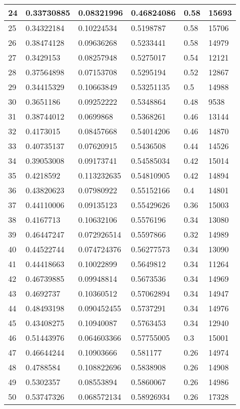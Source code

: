 \begin{longtable}{|l|l|l|l|l|l|}
24 & 0.33730885 & 0.08321996 & 0.46824086 & 0.58 & 15693 \\ \hline 
25 & 0.34322184 & 0.10224534 & 0.5198787 & 0.58 & 15706 \\ \hline 
26 & 0.38474128 & 0.09636268 & 0.5233441 & 0.58 & 14979 \\ \hline 
27 & 0.3429153 & 0.08257948 & 0.5275017 & 0.54 & 12121 \\ \hline 
28 & 0.37564898 & 0.07153708 & 0.5295194 & 0.52 & 12867 \\ \hline 
29 & 0.34415329 & 0.10663849 & 0.53251135 & 0.5 & 14988 \\ \hline 
30 & 0.3651186 & 0.09252222 & 0.5348864 & 0.48 & 9538 \\ \hline 
31 & 0.38744012 & 0.0699868 & 0.5368261 & 0.46 & 13144 \\ \hline 
32 & 0.4173015 & 0.08457668 & 0.54014206 & 0.46 & 14870 \\ \hline 
33 & 0.40735137 & 0.07620915 & 0.5436508 & 0.44 & 14526 \\ \hline 
34 & 0.39053008 & 0.09173741 & 0.54585034 & 0.42 & 15014 \\ \hline 
35 & 0.4218592 & 0.113232635 & 0.54810905 & 0.42 & 14894 \\ \hline 
36 & 0.43820623 & 0.07980922 & 0.55152166 & 0.4 & 14801 \\ \hline 
37 & 0.44110006 & 0.09135123 & 0.55429626 & 0.36 & 15003 \\ \hline 
38 & 0.4167713 & 0.10632106 & 0.5576196 & 0.34 & 13080 \\ \hline 
39 & 0.46447247 & 0.072926514 & 0.5597866 & 0.32 & 14989 \\ \hline 
40 & 0.44522744 & 0.074724376 & 0.56277573 & 0.34 & 13090 \\ \hline 
41 & 0.44418663 & 0.10022899 & 0.5649812 & 0.34 & 11264 \\ \hline 
42 & 0.46739885 & 0.09948814 & 0.5673536 & 0.34 & 14969 \\ \hline 
43 & 0.4692737 & 0.10360512 & 0.57062894 & 0.34 & 14947 \\ \hline 
44 & 0.48493198 & 0.090452455 & 0.5737291 & 0.34 & 14976 \\ \hline 
45 & 0.43408275 & 0.10940087 & 0.5763453 & 0.34 & 12940 \\ \hline 
46 & 0.51443976 & 0.064603366 & 0.57755005 & 0.3 & 15001 \\ \hline 
47 & 0.46644244 & 0.10903666 & 0.581177 & 0.26 & 14974 \\ \hline 
48 & 0.4788584 & 0.108822696 & 0.5838908 & 0.26 & 14908 \\ \hline 
49 & 0.5302357 & 0.08553894 & 0.5860067 & 0.26 & 14986 \\ \hline 
50 & 0.53747326 & 0.068572134 & 0.58926934 & 0.26 & 17328 \\ \hline 
\end{longtable}